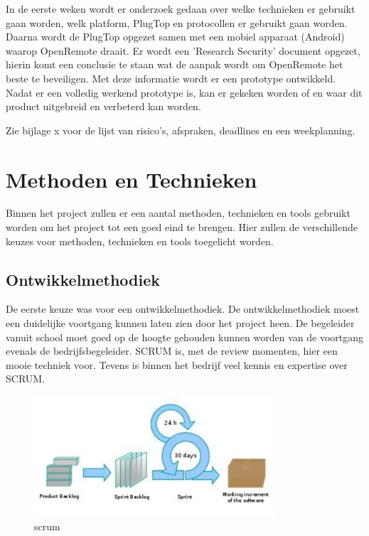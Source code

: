 \documentclass[]{article}
\begin{document}
In de eerste weken wordt  er  onderzoek  gedaan  over  welke  technieken  er
gebruikt gaan worden, welk platform,  PlugTop  en  protocollen  er  gebruikt
gaan worden. Daarna wordt de PlugTop opgezet samen met een  mobiel  apparaat
(Android)  waarop  OpenRemote  draait.  Er  wordt  een  'Research  Security'
document opgezet, hierin komt een conclusie te staan wat de aanpak wordt  om
OpenRemote het beste  te  beveiligen.  Met  deze  informatie  wordt  er  een
prototype ontwikkeld. Nadat er een volledig werkend  prototype  is,  kan  er
gekeken worden of en waar dit product uitgebreid en verbeterd kan worden.

Zie bijlage x voor de  lijst  van  risico's,  afspraken,  deadlines  en  een
weekplanning.

\newpage
\section{Methoden en Technieken}

Binnen het project zullen er een aantal methoden, technieken en tools
gebruikt worden om het project tot een goed eind te brengen. Hier zullen de
verschillende keuzes voor methoden, technieken en tools toegelicht worden.

\subsection{Ontwikkelmethodiek}
De eerste keuze was voor een ontwikkelmethodiek. De ontwikkelmethodiek
moest een duidelijke voortgang kunnen laten zien door het project heen. De
begeleider vanuit school moet goed op de hoogte gehouden kunnen worden van
de voortgang evenals de bedrijfsbegeleider. SCRUM is, met de review
momenten, hier een mooie techniek voor. Tevens is binnen het bedrijf veel
kennis en expertise over SCRUM.

\begin{figure}[htpb]
  \begin{center}
    \includegraphics[width=0.80\textwidth]{scrum.pdf}
  \end{center}
  \caption{scrum}
\end{figure}
\end{document}
